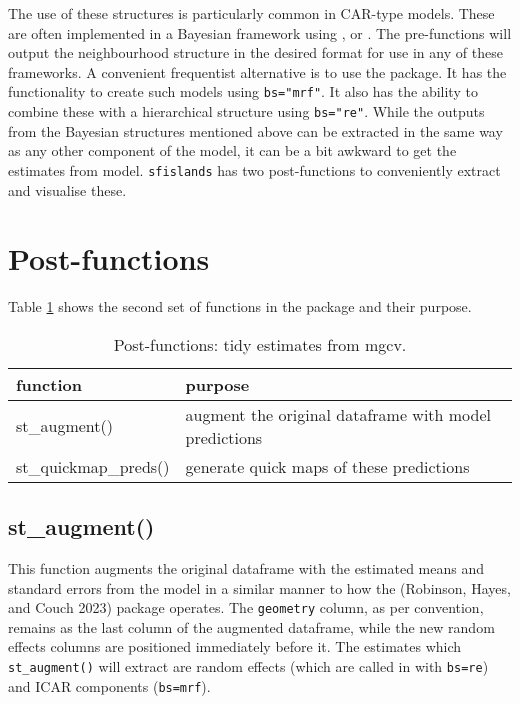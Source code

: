 The use of these structures is particularly common in CAR-type models.
These are often implemented in a Bayesian framework using
,  or . The pre-functions will output the
neighbourhood structure in the desired format for use in any of these
frameworks. A convenient frequentist alternative is to use the
 package. It has the functionality to create such models
using \texttt{bs="mrf"}. It also has the ability to combine these with a
hierarchical structure using \texttt{bs="re"}. While the outputs from the
Bayesian structures mentioned above can be extracted in the same way as
any other component of the model, it can be a bit awkward to get the
estimates from  model. \texttt{sfislands} has two post-functions to conveniently extract and visualise these.

\hypertarget{post-functions}{%
\section{Post-functions}\label{post-functions}}

Table \ref{tab:postfunc-latex} shows the second set of functions in the package and their purpose.

\begin{table}

\caption{\label{tab:postfunc-latex}Post-functions: tidy estimates from mgcv.}
\centering
\fontsize{9}{11}\selectfont
\begin{tabular}[t]{l|l}
\hline
function & purpose\\
\hline
st\_augment() & augment the original dataframe with model predictions\\
\hline
st\_quickmap\_preds() & generate quick maps of these predictions\\
\hline
\end{tabular}
\end{table}

\hypertarget{st_augment}{%
\subsection{st\_augment()}\label{st_augment}}

This function augments the original dataframe with the estimated means
and standard errors from the  model in a similar manner to
how the  (Robinson, Hayes, and Couch 2023) package operates. The \texttt{geometry} column, as per convention, remains as the last column of the augmented dataframe, while the new random effects columns are positioned immediately before it. The estimates which \texttt{st\_augment()} will extract are random effects (which are called in  with \texttt{bs=\textquotesingle{}re\textquotesingle{}}) and ICAR components (\texttt{bs=\textquotesingle{}mrf\textquotesingle{}}).

